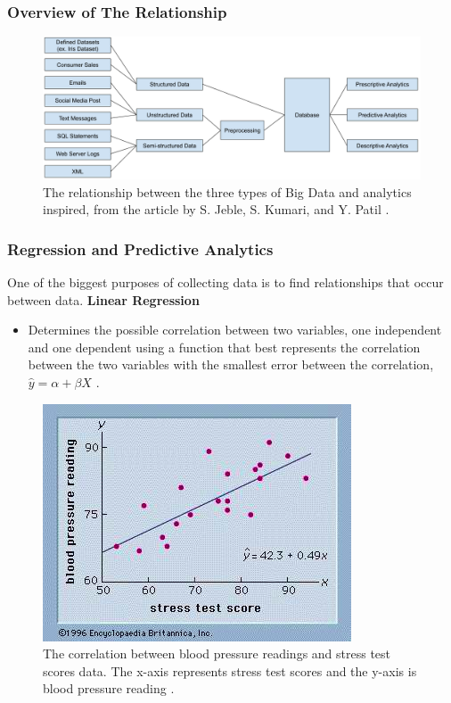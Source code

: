 \documentclass{beamer}
\begin{document}
\begin{frame}
\frametitle{Overview of The Relationship}
\begin{figure}
\centering
\includegraphics[scale=0.32]{Analytics}
\caption{\footnotesize The relationship between the three types of Big Data and analytics inspired, from the article by S. Jeble, S. Kumari, and Y. Patil \cite{Jeble2016}.}
\end{figure}
\end{frame}


\begin{frame}
\frametitle{Regression and Predictive Analytics}
\scriptsize
One of the biggest purposes of collecting data is to find relationships that occur between data.
\newline
\newline
\textbf{Linear Regression}
\begin{itemize}
    \item Determines the possible correlation between two variables, one independent and one dependent using a function that best represents the correlation between the two variables with the smallest error between the correlation, $\hat{y}=\alpha+\beta X$ \cite{Stats2015}.
\end{itemize}
\begin{figure}[h]
\includegraphics[scale=0.37]{LinReg}
\caption{ \scriptsize The correlation between blood pressure readings and stress test scores data. The x-axis represents stress test scores and the y-axis is blood pressure reading \cite{LinPNG}.}
\end{figure}

\end{frame}
\end{document}
